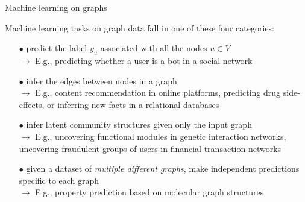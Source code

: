 \documentclass[10pt, aspectratio=169, compress, protectframetitle, handout]{beamer}
\begin{document}
\begin{frame}{Machine learning on graphs}

    Machine learning tasks on graph data fall in one of these four categories:
    \begin{itemize}[topsep=4pt,itemsep=8pt]
        \item[{$\bullet$}] { predict the label $y_u$ associated with all the nodes $u \in V$}\\
        \quad $\longrightarrow$ \; E.g., predicting whether a user is a bot in a social network
        
        \item[{$\bullet$}] {
        infer the edges between nodes in a graph}\\ 
        \quad $\longrightarrow$ \; E.g., content recommendation in online platforms, predicting drug side-effects, or inferring new facts in a relational databases
        
        \item[{$\bullet$}] { infer latent community structures given only the input graph}\\
        \quad $\longrightarrow$ \; E.g.,  uncovering functional modules in genetic interaction networks, uncovering fraudulent groups of users in financial transaction networks
        
        \item[{$\bullet$}] { given a dataset of \emph{multiple different graphs}, make independent predictions specific to each graph}\\
        \quad $\longrightarrow$ \; E.g., property prediction based on molecular graph structures 
    \end{itemize}

\end{frame}
\end{document}
